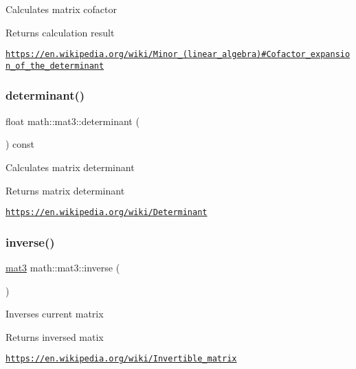 Calculates matrix cofactor \begin{DoxyReturn}{Returns}
calculation result
\end{DoxyReturn}
\href{https://en.wikipedia.org/wiki/Minor_(linear_algebra)#Cofactor_expansion_of_the_determinant}{\tt https\+://en.\+wikipedia.\+org/wiki/\+Minor\+\_\+(linear\+\_\+algebra)\#\+Cofactor\+\_\+expansion\+\_\+of\+\_\+the\+\_\+determinant} \mbox{\label{structmath_1_1mat3_a46cd8291370c457e4a7395b03f46588a}} 
\subsubsection{\texorpdfstring{determinant()}{determinant()}}
{\footnotesize\ttfamily float math\+::mat3\+::determinant (\begin{DoxyParamCaption}{ }\end{DoxyParamCaption}) const\hspace{0.3cm}{\ttfamily [inline]}}

Calculates matrix determinant \begin{DoxyReturn}{Returns}
matrix determinant
\end{DoxyReturn}
\href{https://en.wikipedia.org/wiki/Determinant}{\tt https\+://en.\+wikipedia.\+org/wiki/\+Determinant} \mbox{\label{structmath_1_1mat3_af25e86e0941c58e80aa3f9c7c06567d9}} 
\subsubsection{\texorpdfstring{inverse()}{inverse()}}
{\footnotesize\ttfamily \hyperlink{structmath_1_1mat3}{mat3} math\+::mat3\+::inverse (\begin{DoxyParamCaption}{ }\end{DoxyParamCaption})\hspace{0.3cm}{\ttfamily [inline]}}

Inverses current matrix \begin{DoxyReturn}{Returns}
inversed matix
\end{DoxyReturn}
\href{https://en.wikipedia.org/wiki/Invertible_matrix}{\tt https\+://en.\+wikipedia.\+org/wiki/\+Invertible\+\_\+matrix} \mbox{\label{structmath_1_1mat3_a023a7c3f0beababef2e8637fd008d20f}} 
